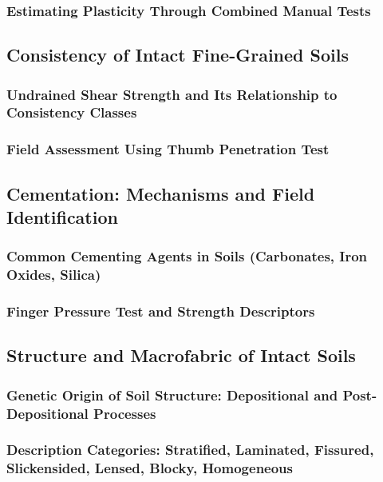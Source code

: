 \subsubsection{Estimating Plasticity Through Combined Manual Tests}

\subsection{Consistency of Intact Fine-Grained Soils}

\subsubsection{Undrained Shear Strength and Its Relationship to Consistency Classes}

\subsubsection{Field Assessment Using Thumb Penetration Test}

\subsection{Cementation: Mechanisms and Field Identification}

\subsubsection{Common Cementing Agents in Soils (Carbonates, Iron Oxides, Silica)}

\subsubsection{Finger Pressure Test and Strength Descriptors}

\subsection{Structure and Macrofabric of Intact Soils}

\subsubsection{Genetic Origin of Soil Structure: Depositional and Post-Depositional Processes}

\subsubsection{Description Categories: Stratified, Laminated, Fissured, Slickensided, Lensed, Blocky, Homogeneous}

